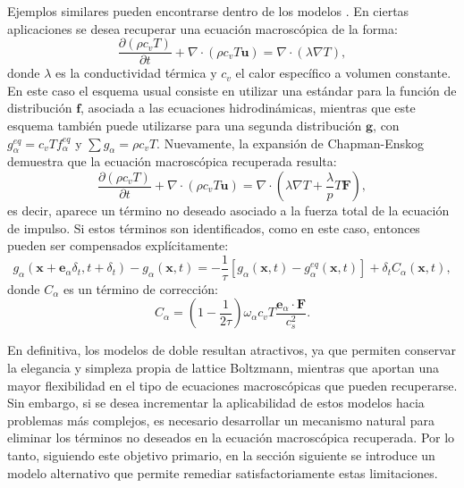 Ejemplos similares pueden encontrarse dentro de los modelos \pp{} \cite{li_effect_2014}. En ciertas aplicaciones se desea recuperar una ecuaci\'on macrosc\'opica de la forma:
\begin{equation}
	\dfrac{\partial (\rho c_v T)}{\partial t} + \nabla \cdot (\rho c_v T \bm{u}) = \nabla \cdot (\lambda \nabla T),
\end{equation}
donde $\lambda$ es la conductividad t\'ermica y $c_v$ el calor espec\'ifico a volumen constante. En este caso el esquema usual consiste en utilizar una \lbe{} \pp{} est\'andar para la funci\'on de distribuci\'on $\bm{f}$, asociada a las ecuaciones hidrodin\'amicas, mientras que este esquema tambi\'en puede utilizarse para una segunda distribuci\'on $\bm{g}$, con $g^{eq}_{\alpha} = c_v T f^{eq}_{\alpha}$ y $\sum g_{\alpha} = \rho c_v T$. Nuevamente, la expansi\'on de Chapman-Enskog demuestra que la ecuaci\'on macrosc\'opica recuperada resulta:
\begin{equation}
	\dfrac{\partial (\rho c_v T)}{\partial t} + \nabla \cdot (\rho c_v T \bm{u}) = \nabla \cdot \left(\lambda \nabla T + \dfrac{\lambda}{p}T\bm{F} \right),
	\label{eq:e_macro_F}
\end{equation}
es decir, aparece un t\'ermino no deseado asociado a la fuerza total de la ecuaci\'on de impulso. Si estos t\'erminos son identificados, como en este caso, entonces pueden ser compensados expl\'icitamente:
\begin{equation}
	g_{\alpha}(\bm{x}+\bm{e}_{\alpha}\delta_t, t+\delta_t) - g_{\alpha}(\bm{x},t) = -\dfrac{1}{\tau} \left[ g_{\alpha}(\bm{x},t) - g^{eq}_{\alpha}(\bm{x},t) \right] + \delta_t C_{\alpha}(\bm{x},t),
\end{equation}
donde $C_{\alpha}$ es un t\'ermino de correcci\'on:
\begin{equation}
	C_{\alpha} = \left( 1-\dfrac{1}{2\tau} \right)\omega_{\alpha}c_v T \dfrac{\bm{e}_{\alpha} \cdot \bm{F}}{c_s^2}.
\end{equation}


En definitiva, los modelos de doble \fdp{} resultan atractivos, ya que permiten conservar la elegancia y simpleza propia de lattice Boltzmann, mientras que aportan una mayor flexibilidad en el tipo de ecuaciones macrosc\'opicas que pueden recuperarse. Sin embargo, si se desea incrementar la aplicabilidad de estos modelos hacia problemas m\'as complejos, es necesario desarrollar un mecanismo natural para eliminar los t\'erminos no deseados en la ecuaci\'on macrosc\'opica recuperada. Por lo tanto, siguiendo este objetivo primario, en la secci\'on siguiente se introduce un modelo alternativo que permite remediar satisfactoriamente estas limitaciones.


